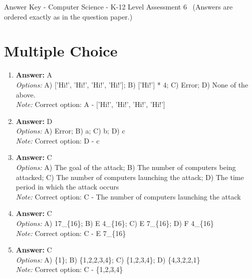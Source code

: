 \documentclass[12pt]{article}
\begin{document}
\begin{center}
Answer Key - Computer Science - K-12 Level Assessment 6 \
\small (Answers are ordered exactly as in the question paper.)
\end{center}

\section*{Multiple Choice}
\begin{enumerate}[label=\arabic*.]
\item \textbf{Answer:} A
\\ \textit{Options:} A) ['Hi!', 'Hi!', 'Hi!', 'Hi!']; B) ['Hi!'] * 4; C) Error; D) None of the above.
\\ \textit{Note:} Correct option: A - ['Hi!', 'Hi!', 'Hi!', 'Hi!']
\item \textbf{Answer:} D
\\ \textit{Options:} A) Error; B) a; C) b; D) c
\\ \textit{Note:} Correct option: D - c
\item \textbf{Answer:} C
\\ \textit{Options:} A) The goal of the attack; B) The number of computers being attacked; C) The number of computers launching the attack; D) The time period in which the attack occurs
\\ \textit{Note:} Correct option: C - The number of computers launching the attack
\item \textbf{Answer:} C
\\ \textit{Options:} A) 17\_\{16\}; B) E 4\_\{16\}; C) E 7\_\{16\}; D) F 4\_\{16\}
\\ \textit{Note:} Correct option: C - E 7\_\{16\}
\item \textbf{Answer:} C
\\ \textit{Options:} A) \{1\}; B) \{1,2,2,3,4\}; C) \{1,2,3,4\}; D) \{4,3,2,2,1\}
\\ \textit{Note:} Correct option: C - \{1,2,3,4\}
\end{enumerate}
\end{document}
